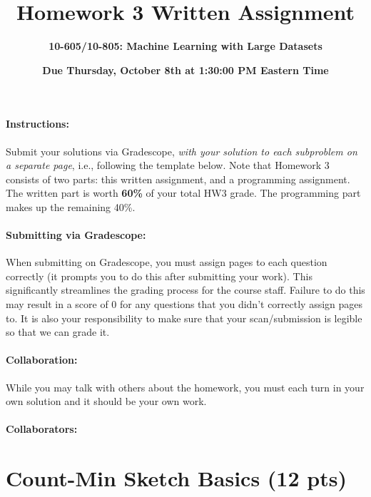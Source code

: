 \documentclass{exam}
\begin{document}
\title{Homework 3 Written Assignment}
\author{\Large \bf 10-605/10-805: Machine Learning with Large Datasets}
\date{{\bf Due Thursday, October 8th at 1:30:00 PM Eastern Time}}
\maketitle

\paragraph{Instructions:} Submit your solutions via Gradescope, \textit{with your solution to each subproblem on a separate page}, i.e., following the template below.  Note that Homework 3 consists of two parts: this written assignment, and a programming assignment. The written part is worth \textbf{60\%} of your total HW3 grade. The programming part makes up the remaining 40\%.

\paragraph{Submitting via Gradescope:} When submitting on Gradescope, you must assign pages to each question correctly (it
prompts you to do this after submitting your work). This significantly streamlines the
grading process for the course staff.  Failure to do this may result in a score of 0 for any questions
that you didn't correctly assign pages to. It is also your responsibility to make sure that your scan/submission is legible so that we can grade it.

\paragraph{Collaboration:}  While you may talk with others about the homework, you must each turn in your own solution and it should be your own work. 

\paragraph{Collaborators:}


\newpage



\section{Count-Min Sketch Basics (12 pts)} 
\end{document}
